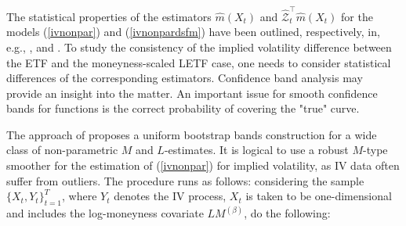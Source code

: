 \documentclass{rQUF2e}
\theoremstyle{plain}
\theoremstyle{definition}
\begin{document}
	The statistical properties of the estimators $\widehat{m}(X_t)$ and $\widehat{\mathcal{Z}}^{\top}_t \widehat{m}(X_t)$ for the models (\ref{ivnonpar}) and (\ref{ivnonpardsfm}) have been outlined, respectively, in, e.g., \citet{haerdle_book_reg}, \citet{ruppert_wand} and \citet{park_et_al}. To study the consistency of the implied volatility difference between the ETF and the moneyness-scaled LETF case, one needs to consider statistical differences of the corresponding estimators. Confidence band analysis may provide an insight into the matter. An important issue for smooth confidence bands for functions is the correct probability of covering the "true" curve.
	
	The approach of \citet{haerdle_ritov_wang} proposes a uniform bootstrap bands construction for a wide class of non-parametric $M$ and $L$-estimates. It is logical to use a robust $M$-type smoother for the estimation of (\ref{ivnonpar}) for implied volatility, as IV data often suffer from outliers. The procedure runs as follows: considering the sample $\{X_t,Y_t\}_{t=1}^T$, where $Y_t$ denotes the IV process, $X_t$ is taken to be one-dimensional and includes the log-moneyness covariate $LM^{(\beta)}$, do the following:
	
\end{document}
